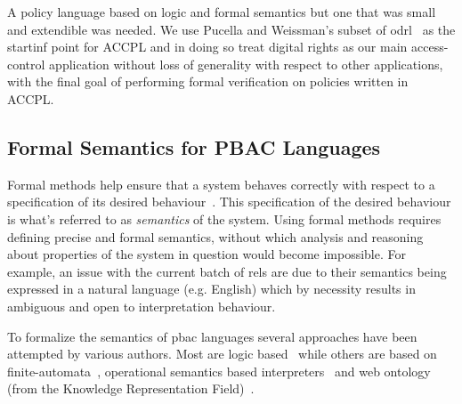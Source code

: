 \documentclass[runningheads,a4paper]{llncs}
\begin{document}
A policy language based on logic and formal semantics but one that was small and extendible was needed. We use Pucella and Weissman's subset of \ac{odrl}~\cite{pucella2006} as the startinf point for \ac{ACCPL} and in doing so treat digital rights as our main access-control application without loss of generality with respect to other applications, with the final goal of performing formal verification on policies written in \ac{ACCPL}.



\subsection{Formal Semantics for PBAC Languages}


Formal methods help ensure that a system behaves correctly with respect to a specification of its desired behaviour~\cite{TAPL}. This specification of the desired behaviour is what's referred to as \emph{semantics} of the system. Using formal methods requires defining precise and formal semantics, without which analysis and reasoning about properties of the system in question would become impossible. For example, an issue with the current batch of \ac{rel}s are due to their semantics being expressed in a natural language (e.g. English) which by necessity results in ambiguous and open to interpretation behaviour. 

To formalize the semantics of \ac{pbac} languages several approaches have been attempted by various authors. Most are logic based~\cite{Halpern2008,pucella2006} while others are based on finite-automata~\cite{Holzer}, operational semantics based interpreters~\cite{Safavi-naini} and web ontology (from the Knowledge Representation Field)~\cite{Kasten2010MTS}. 
\end{document}
